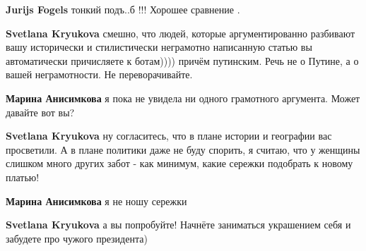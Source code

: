 \begin{itemize}
\begin{itemize}
\textbf{Jurijs Fogels} тонкий подъ..б !!! Хорошее сравнение .

 
\textbf{Svetlana Kryukova} смешно, что людей, которые аргументированно разбивают вашу исторически и стилистически неграмотно написанную статью вы автоматически причисляете к ботам)))) причём путинским. Речь не о Путине, а о вашей неграмотности. Не переворачивайте.


 
\textbf{Марина Анисимкова} я пока не увидела ни одного грамотного аргумента. Может давайте вот вы?

 
\textbf{Svetlana Kryukova} ну согласитесь, что в плане истории и географии вас просветили. А в плане политики даже не буду спорить, я считаю, что у женщины слишком много других забот - как минимум, какие сережки подобрать к новому платью!

 
\textbf{Марина Анисимкова} я не ношу сережки

 
\textbf{Svetlana Kryukova} а вы попробуйте! Начнёте заниматься украшением себя и забудете про чужого президента)


 

\end{itemize}
\end{itemize}
